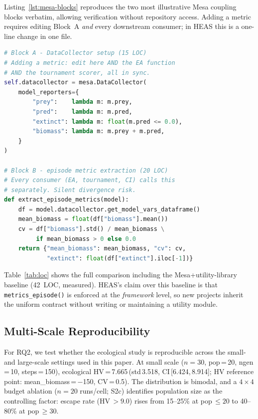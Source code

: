 \documentclass{wscpaperproc}
\begin{document}
Listing~\ref{lst:mesa-blocks} reproduces the two most illustrative
Mesa coupling blocks verbatim, allowing verification without repository
access. Adding a metric requires editing Block~A \emph{and} every downstream
consumer; in HEAS this is a one-line change in one file.

\begin{lstlisting}[caption={Mesa coupling code Blocks A and B (35 LOC from
    \texttt{experiments/mesa\_eco.py}). HEAS equivalent: zero LOC.},
    label=lst:mesa-blocks, language=Python]
# Block A - DataCollector setup (15 LOC)
# Adding a metric: edit here AND the EA function
# AND the tournament scorer, all in sync.
self.datacollector = mesa.DataCollector(
    model_reporters={
        "prey":    lambda m: m.prey,
        "pred":    lambda m: m.pred,
        "extinct": lambda m: float(m.pred <= 0.0),
        "biomass": lambda m: m.prey + m.pred,
    }
)

# Block B - episode metric extraction (20 LOC)
# Every consumer (EA, tournament, CI) calls this
# separately. Silent divergence risk.
def extract_episode_metrics(model):
    df = model.datacollector.get_model_vars_dataframe()
    mean_biomass = float(df["biomass"].mean())
    cv = df["biomass"].std() / mean_biomass \
         if mean_biomass > 0 else 0.0
    return {"mean_biomass": mean_biomass, "cv": cv,
            "extinct": float(df["extinct"].iloc[-1])}
\end{lstlisting}

Table~\ref{tab:loc} shows the full comparison including the Mesa+utility-library
baseline (42~LOC, measured). HEAS's claim over this baseline is that
\texttt{metrics\_episode()} is enforced at the \emph{framework} level, so new
projects inherit the uniform contract without writing or maintaining a
utility module.

\subsection{Multi-Scale Reproducibility}
\label{sec:multiscale}

For RQ2, we test whether the ecological study is reproducible across the
small- and large-scale settings used in this paper. At small scale
($n\!=\!30$, pop\,=\,20, ngen\,=\,10, steps\,=\,150),
ecological HV\,=\,7.665\,(std\,3.518, CI\,[6.424,\,8.914]; HV reference point:
mean\_biomass\,=\,$-$150, CV\,=\,0.5).
The distribution is bimodal, and a $4\!\times\!4$ budget ablation
($n\!=\!20$ runs/cell; S2c) identifies population size as the controlling
factor: escape rate (HV\,$>\!9.0$) rises from 15--25\% at pop\,$\le\!20$ to
40--80\% at pop\,$\ge\!30$.
\end{document}

